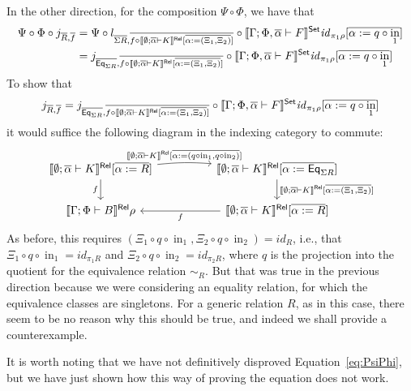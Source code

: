 \documentclass{lmcs}
\theoremstyle{plain}\newtheorem{satz}[thm]{Satz}
\renewcommand{\id}{\mathit{id}}
\DeclareMathOperator{\SumIn}{in}
\begin{document}
In the other direction, for the composition $\Psi \circ \Phi$, we have that
\begin{align*}
\Psi \circ \Phi \circ j_{\ol{R}, \ol{f}}
&= \Psi \circ l_{\ol{\Sigma{R}}, \ol{f \circ \relsem{\emptyset; \ol\alpha \vdash K}[\ol{\alpha := (\Xi_1, \Xi_2)}]}} \circ \setsem{\Gamma; \Phi, \ol\alpha \vdash F} \id_{\pi_1 \rho}[\ol{\alpha := q \circ \SumIn_1}] \\
&= j_{\ol{\Eq_{\Sigma{R}}}, \ol{f \circ \relsem{\emptyset; \ol\alpha \vdash K}[\ol{\alpha := (\Xi_1, \Xi_2)}]}} \circ \setsem{\Gamma; \Phi, \ol\alpha \vdash F} \id_{\pi_1 \rho}[\ol{\alpha := q \circ \SumIn_1}]
\end{align*}
To show that
\begin{equation}\label{eq:PsiPhi}
j_{\ol{R}, \ol{f}} = j_{\ol{\Eq_{\Sigma{R}}}, \ol{f \circ \relsem{\emptyset; \ol\alpha \vdash K}[\ol{\alpha := (\Xi_1, \Xi_2)}]}} \circ \setsem{\Gamma; \Phi, \ol\alpha \vdash F} \id_{\pi_1 \rho}[\ol{\alpha := q \circ \SumIn_1}]
\end{equation}
it would suffice the following diagram in the indexing category to commute:
\begin{equation}\label{eq:index-comm}
\begin{tikzcd}[column sep = huge]
\relsem{\emptyset; \ol{\alpha} \vdash K}[\ol{\alpha := R}]
\ar[r, bend left = 5, "{\relsem{\emptyset; \ol{\alpha} \vdash K}[\ol{\alpha := (q \circ \SumIn_1, q \circ \SumIn_2)}]}"]
\ar[d, "{f}"']
& \relsem{\emptyset; \ol{\alpha} \vdash K}[\ol{\alpha := \Eq_{\Sigma{R}}}]
\ar[d, "{\relsem{\emptyset; \ol{\alpha} \vdash K}[\ol{\alpha := (\Xi_1, \Xi_2)}]}"] \\
\relsem{\Gamma; \Phi \vdash B}\rho
& \relsem{\emptyset; \ol{\alpha} \vdash K}[\ol{\alpha := R}]
\ar[l, "{f}"]
\end{tikzcd}
\end{equation}
As before, this requires $(\Xi_1 \circ q \circ \SumIn_1, \Xi_2 \circ q \circ \SumIn_2) = \id_{R}$, i.e., that $\Xi_1 \circ q \circ \SumIn_1 = \id_{\pi_1 R}$ and $\Xi_2 \circ q \circ \SumIn_2 = \id_{\pi_2 R}$, where $q$ is the projection into the quotient for the equivalence relation $\sim_{R}$.
But that was true in the previous direction because we were considering an equality relation, for which the equivalence classes are singletons.
For a generic relation $R$, as in this case, there seem to be no reason why this should be true, and indeed we shall provide a counterexample.

It is worth noting that we have not definitively disproved Equation~\ref{eq:PsiPhi}, but we have just shown how this way of proving the equation does not work.
\end{document}
